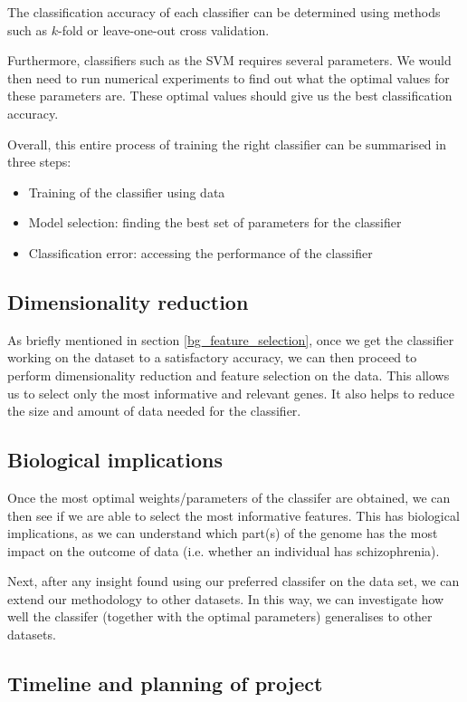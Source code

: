 \documentclass[12pt, twoside, a4paper]{article}
\begin{document}
The classification accuracy of each classifier can be determined using methods such as $k$-fold or leave-one-out cross validation.

Furthermore, classifiers such as the SVM requires several parameters. We would then need to run numerical  experiments to find out what the optimal values for these parameters are. These optimal values should give us the best classification accuracy.

Overall, this entire process of training the right classifier can be summarised in three steps:
\begin{itemize}
\item Training of the classifier using data
\item Model selection: finding the best set of parameters for the classifier
\item Classification error: accessing the performance of the classifier
\end{itemize}

\subsection{Dimensionality reduction}
As briefly mentioned in section \ref{bg_feature_selection}, once we get the classifier working on the dataset to a satisfactory accuracy, we can then proceed to perform dimensionality reduction and feature selection on the data. This allows us to select only the most informative and relevant genes. It also helps to reduce the size and amount of data needed for the classifier.

\subsection{Biological implications}
Once the most optimal weights/parameters of the classifer are obtained, we can then see if we are able to select the most informative features. This has biological implications, as we can understand which part(s) of the genome has the most impact on the outcome of data (i.e. whether an individual has schizophrenia).

Next, after any insight found using our preferred classifer on the data set, we can extend our methodology to other datasets. In this way, we can investigate how well the classifer (together with the optimal parameters) generalises to other datasets.

\subsection{Timeline and planning of project}
\end{document}
